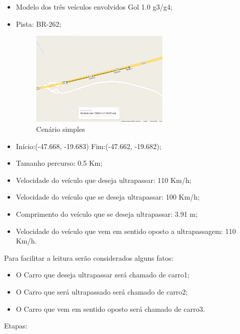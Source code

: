 \begin{itemize}
	\item Modelo dos três veículos envolvidos Gol 1.0 g3/g4;
	\item Pista: BR-262;
	
\begin{figure}[h!]
  \centering
  \includegraphics[width=250px, scale=1]{figuras/modelo_pista}
  \caption{Cenário simples}
\label{fig:modelo_pista}
\end{figure}

	\item Início:(-47.668, -19.683) Fim:(-47.662, -19.682);
	\item Tamanho percurso: 0.5 Km;
	\item Velocidade do veículo que deseja ultrapassar: 110 Km/h;
	\item Velocidade do veículo que se deseja ultrapassar: 100 Km/h;
	\item Comprimento do veículo que se deseja ultrapassar: 3.91 m;
	\item Velocidade do veículo que vem em sentido oposto a ultrapassagem: 110 Km/h.
\end{itemize}
	
	
Para facilitar a leitura serão considerados alguns fatos: 

\begin{itemize}
	\item O Carro que deseja ultrapassar será chamado de carro1;
	\item O Carro que será ultrapassado será chamado de carro2;
	\item O Carro que vem em sentido oposto será chamado de carro3.
\end{itemize}

Etapas:

